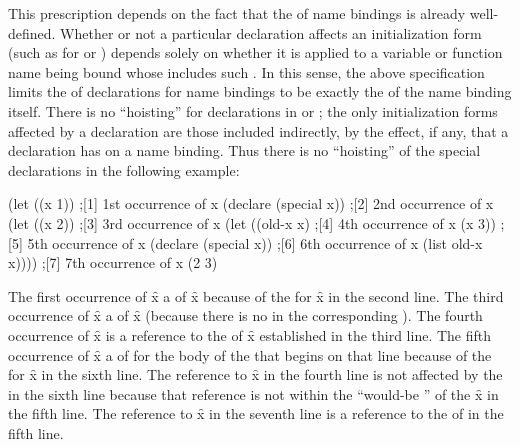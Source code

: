 This prescription depends on the fact that the  of name bindings
is already well-defined.
Whether or not a particular declaration affects an initialization form 
(such as for  or ) 
depends solely on whether it is
applied to a variable or function name being bound whose 
includes such .  
In this sense, the above specification limits the
 of declarations for name bindings to be exactly the 
 of the
name binding itself. 
There is no ``hoisting'' for declarations in  or 
; 
the only initialization forms affected by a declaration 
are those included indirectly, by the effect, if any, that a 
declaration has on a name binding. 
Thus there is no
``hoisting'' of the special declarations in the following example:

% 

\code
 (let ((x 1))                ;[1] 1st occurrence of x
   (declare (special x))     ;[2] 2nd occurrence of x
   (let ((x 2))              ;[3] 3rd occurrence of x
     (let ((old-x x)         ;[4] 4th occurrence of x
           (x 3))            ;[5] 5th occurrence of x
       (declare (special x)) ;[6] 6th occurrence of x
       (list old-x x))))     ;[7] 7th occurrence of x
\EV (2 3)
\endcode

The first occurrence of \f{x}  a 
of \f{x} because of the   for \f{x}
in the second line.  The third occurrence of \f{x}  a
 of \f{x} (because there is no 
 in the corresponding  ).
The fourth occurrence of \f{x}  is a reference to the
 of \f{x} established in the third line.
The fifth occurrence of \f{x}  a 
of  for the body of the   that begins on
that line because of the   for \f{x}
in the sixth line. The reference to \f{x} in the fourth line is not
affected by the   in the sixth line 
because that reference is not within the ``would-be ''
of the  \f{x} in the fifth line.  The reference to \f{x}
in the seventh line is a reference to the  of 
 in the fifth line.

